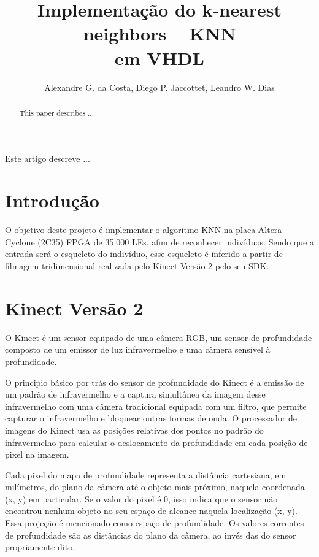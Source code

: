 \documentclass[12pt]{article}
\title{Implementa\c{c}\~ao do k-nearest neighbors -- KNN\\ em VHDL}
\author{Alexandre G. da Costa\inst{1}, Diego P. Jaccottet\inst{1}, Leandro W.
  Dias\inst{1} }
\begin{document}
 

\maketitle

\begin{abstract}
  This paper describes ...
\end{abstract}
     
\begin{resumo} 
  Este artigo descreve ...
\end{resumo}


\section{Introdu\c{c}\~ao}

O objetivo deste projeto é implementar o algoritmo KNN na placa Altera Cyclone
(2C35) FPGA de 35.000 LEs, afim de reconhecer indivíduos. Sendo que a entrada
será o esqueleto do indivíduo, esse esqueleto é inferido a partir de filmagem
tridimensional realizada pelo Kinect Versão 2 pelo seu SDK. 

\section{Kinect Vers\~ao 2} \label{sec:kinectversion2}

O Kinect é um sensor equipado de uma câmera RGB, um sensor de profundidade
composto de um emissor de luz infravermelho e uma câmera sensível à
profundidade. 

O principio básico por trás do sensor de profundidade do Kinect é a emissão
de um padrão de infravermelho e a captura simultânea da imagem desse
infravermelho com uma câmera tradicional equipada com um filtro, que permite
capturar o infravermelho e bloquear outras formas de onda. O processador de
imagens do Kinect usa as posições relativas dos pontos no padrão do
infravermelho para calcular o deslocamento da profundidade em cada posição de
pixel na imagem.

Cada pixel do mapa de profundidade representa a distância cartesiana,
em milímetros, do plano da câmera até o objeto mais próximo, naquela coordenada
(x, y) em particular. Se o valor do pixel é 0, isso indica que o sensor não
encontrou nenhum objeto no seu espaço de alcance naquela localização (x, y).
Essa projeção é mencionado como espaço de profundidade. Os valores correntes
de profundidade são as distâncias do plano da câmera, ao invés das do sensor
propriamente dito.
\end{document}

